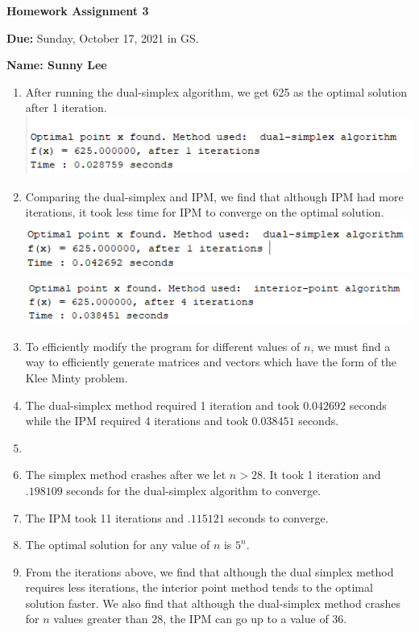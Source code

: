 \documentclass[12pt,english]{article}
\begin{document}
\textbf{Homework Assignment 3}\vspace{0.4cm}

\textbf{Due: }Sunday, October 17, 2021 in GS.\vspace{0.6cm}

\textbf{Name: Sunny Lee\underline{\hspace{12cm}}\vspace{0.4cm}}

\begin{enumerate}
    \item After running the dual-simplex algorithm, we get 625 as the optimal solution
    after 1 iteration. \\
    \includegraphics{1a.png}
    \item Comparing the dual-simplex and IPM, we find that although IPM had more iterations, 
    it took less time for IPM to converge on the optimal solution. \\
    \includegraphics{2a.png}\\
    \includegraphics{2b.png}
    \item 
    To efficiently modify the program for different values of $n$, we must find a 
    way to efficiently generate matrices and vectors which have the form of the Klee
    Minty problem. 
    \item 
    The dual-simplex method required 1 iteration and took $0.042692$ seconds while the 
    IPM required 4 iterations and took $0.038451$ seconds. 
    \item 
    \item 
    The simplex method crashes after we let $n>28$. It took 1 iteration and $ .198109$ 
    seconds for the dual-simplex algorithm to converge. 
    \item 
    The IPM took 11 iterations and $.115121$ seconds to converge. 
    \item 
    The optimal solution for any value of $n$ is $5^n$. 
    \item 
    From the iterations above, we find that although the dual simplex method requires 
    less iterations, the interior point method tends to the optimal solution faster. 
    We also find that although the dual-simplex method crashes for $n$ values greater
    than 28, the IPM can go up to a value of 36. 
    
\end{enumerate}
\end{document}
